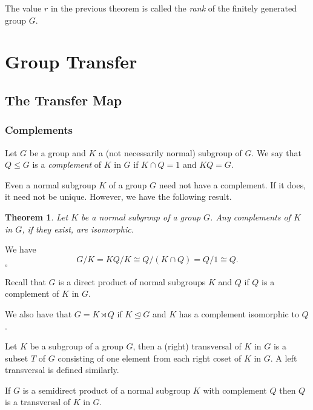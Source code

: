 \documentclass[10pt]{article}
\newtheorem{theorem}{Theorem}[section]
\newenvironment{proof}[1][Proof]{\begin{trivlist}
\item[\hskip \labelsep {\itshape #1}]}{\end{trivlist}}
\newenvironment{definition}[1][Definition]{\begin{trivlist}
\item[\hskip \labelsep {\bfseries #1}]}{\end{trivlist}}
\begin{document}
\begin{definition}
The value $r$ in the previous theorem is called the \emph{rank} of the finitely generated group $G$.
\end{definition}

\section{Group Transfer}

\subsection{The Transfer Map}

\subsubsection{Complements}

\begin{definition}
Let $G$ be a group and $K$ a (not necessarily normal) subgroup of $G$. We say that $Q \leq G$ is a \emph{complement} of $K$ in $G$ if $K\cap Q = 1$ and $KQ = G$.
\end{definition}

Even a normal subgroup $K$ of a group $G$ need not have a complement. If it does, it need not be unique. However, we have the following result.

\begin{theorem}
Let $K$ be a normal subgroup of a group $G$. Any complements of $K$ in $G$, if they exist, are isomorphic.
\end{theorem}

\begin{proof}
We have
$$G/K = KQ/K \cong Q/(K\cap Q) = Q/1 \cong Q.$$ $\square$
\end{proof}

Recall that $G$ is a direct product of normal subgroups $K$ and $Q$ if $Q$ is a complement of $K$ in $G$.

We also have that $G = K\rtimes Q$ if $K \mathrel{\unlhd} G$ and $K$ has a complement isomorphic to $Q$.

\begin{definition}
Let $K$ be a subgroup of a group $G$, then a (right) transversal of $K$ in $G$ is a subset $T$ of $G$ consisting of one element from each right coset of $K$ in $G$. A left transversal is defined similarly.
\end{definition}

If $G$ is a semidirect product of a normal subgroup $K$ with complement $Q$ then $Q$ is a transversal of $K$ in $G$.
\end{document}
